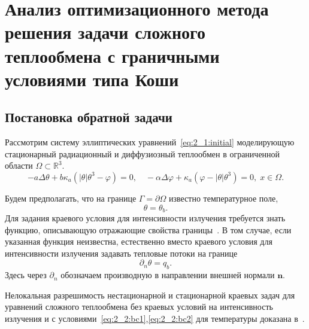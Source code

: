\section{Анализ оптимизационного метода решения
задачи сложного теплообмена с граничными условиями типа
Коши}\label{sec:ch2/sec2}

\subsection{Постановка обратной задачи}\label{subsec:ch2/sec2/subsec1}
Рассмотрим систему эллиптических уравнений~\eqref{eq:2_1:initial}
моделирующую стационарный радиационный и диффузиозный теплообмен в
ограниченной области $\Omega \subset \mathbb{R}^3$.
\begin{equation}
    \label{eq:2_2:eq1}
    - a\Delta\theta + b\kappa_a(|\theta|\theta^3- \varphi)=0, \quad
    -\alpha \Delta \varphi
    + \kappa_a(\varphi-|\theta|\theta^3)=0,\; x\in\Omega.
\end{equation}

Будем предполагать, что на границе $\Gamma = \partial \Omega$ известно температурное поле,
\begin{equation}
    \label{eq:2_2:bc1} \theta = \theta_b.
\end{equation}
Для задания краевого условия для интенсивности излучения
требуется знать функцию, описывающую отражающие свойства границы~\cite{JVM-14}.
В том случае, если указанная функция неизвестна, естественно вместо
краевого условия для интенсивности излучения задавать тепловые потоки на границе
\begin{equation}
    \label{eq:2_2:bc2}
    \partial_n\theta = q_b.
\end{equation}
Здесь через $\partial_n$ обозначаем производную в направлении
внешней нормали $\mathbf n$.

Нелокальная разрешимость нестационарной и
стационарной краевых задач для уравнений сложного теплообмена
без краевых условий на интенсивность излучения и
с условиями~\eqref{eq:2_2:bc1},\eqref{eq:2_2:bc2}
для температуры доказана в~\cite{Chebotarev2019Problem,CMMP20}.

